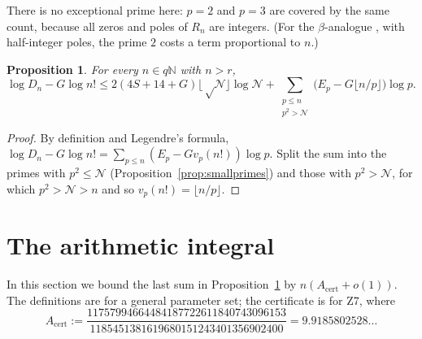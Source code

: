 \documentclass[11pt]{amsart}
\newtheorem{proposition}[theorem]{Proposition}
\theoremstyle{definition}
\theoremstyle{remark}
\numberwithin{equation}{section}
\newcommand{\NN}{\mathbb{N}}
\newcommand{\cN}{\mathcal{N}}
\newcommand{\Acert}{A_{\mathrm{cert}}}
\begin{document}
There is no exceptional prime here: $p=2$ and $p=3$ are covered by the same count, because all zeros and poles
of $R_n$ are integers. (For the $\beta$-analogue \cite{BetaPaper}, with half-integer poles, the prime $2$ costs
a term proportional to $n$.)

\begin{proposition}\label{prop:decomp}
For every $n\in q\NN$ with $n>r$,
\[
  \log D_n-G\log n!\le2(4S+14+G)\lfloor\sqrt\cN\rfloor\log\cN
  +\sum_{\substack{p\le n\\p^2>\cN}}\bigl(E_p-G\lfloor n/p\rfloor\bigr)\log p .
\]
\end{proposition}

\begin{proof}
By definition and Legendre's formula, $\log D_n-G\log n!=\sum_{p\le n}(E_p-Gv_p(n!))\log p$. Split the sum into the
primes with $p^2\le\cN$ (Proposition~\ref{prop:smallprimes}) and those with $p^2>\cN$, for which $p^2>\cN>n$ and so
$v_p(n!)=\lfloor n/p\rfloor$.
\end{proof}

\section{The arithmetic integral}\label{sec:A}

In this section we bound the last sum in Proposition~\ref{prop:decomp} by $n(\Acert+o(1))$. The definitions
are for a general parameter set; the certificate is for Z7, where
\begin{equation}\label{eq:Acert}
  \Acert:=\frac{11757994664484187722611840743096153}{1185451381619680151243401356902400}
  =9.9185802528\ldots
\end{equation}
\end{document}
